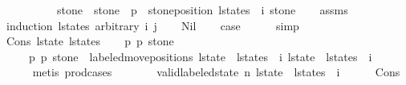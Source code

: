 \begin{isabellebody}
\ \ \ \ \ \ \ \ \ \ stone{\isacharprime}\ {\isacharequal}\ stone\ {\isasymand}\ p{}\ {\isacharequal}\ stone{\isacharunderscore}position\ {\isacharparenleft}l{\isacharunderscore}states\ {\isacharbang}\ i{\isacharparenright}\ stone{\isacharparenright}{\isacharparenright}{\isachardoublequoteclose}\isanewline
%
\isadelimproof
\ \ %
\endisadelimproof
%
\isatagproof
{}\isamarkupfalse%
\ assms\isanewline
{}\isamarkupfalse%
\ {\isacharparenleft}induction\ l{\isacharunderscore}states\ arbitrary{\isacharcolon}\ i\ j{\isacharparenright}\isanewline
\ \ \isamarkupfalse%
\ Nil\isanewline
\ \ \isamarkupfalse%
\ {\isacharquery}case\isanewline
\ \ \ \ \isamarkupfalse%
\ simp\isanewline
{}\isamarkupfalse%
\isanewline
\ \ \isamarkupfalse%
\ {\isacharparenleft}Cons\ l{\isacharunderscore}state\ l{\isacharunderscore}states{\isacharparenright}\isanewline
\ \ \isamarkupfalse%
\ p{}\ p{}\ stone{\isacharprime}\ \ \isanewline
\ \ \ \ {\isacharasterisk}{\isacharcolon}\ {\isachardoublequoteopen}{\isacharparenleft}p{}{\isacharcomma}\ p{}{\isacharcomma}\ stone{\isacharprime}{\isacharparenright}\ {\isacharequal}\ labeled{\isacharunderscore}move{\isacharunderscore}positions\ {\isacharparenleft}{\isacharparenleft}l{\isacharunderscore}state\ {\isacharhash}\ l{\isacharunderscore}states{\isacharparenright}\ {\isacharbang}\ i{\isacharparenright}\ {\isacharparenleft}{\isacharparenleft}l{\isacharunderscore}state\ {\isacharhash}\ l{\isacharunderscore}states{\isacharparenright}\ {\isacharbang}\ {\isacharparenleft}i\ {\isacharplus}\ {}{\isacharparenright}{\isacharparenright}{\isachardoublequoteclose}\isanewline
\ \ \ \ \isamarkupfalse%
\ {\isacharparenleft}metis\ prod{\isacharunderscore}cases{}{\isacharparenright}\isanewline
\isanewline
\ \ \isamarkupfalse%
\isanewline
\isanewline
\ \ \isamarkupfalse%
\ {\isacharasterisk}{\isacharasterisk}{\isacharasterisk}{\isacharcolon}\ {\isachardoublequoteopen}valid{\isacharunderscore}labeled{\isacharunderscore}state\ n\ {\isacharparenleft}{\isacharparenleft}l{\isacharunderscore}state\ {\isacharhash}\ l{\isacharunderscore}states{\isacharparenright}\ {\isacharbang}\ i{\isacharparenright}{\isachardoublequoteclose}\isanewline
\ \ \ \ \isamarkupfalse%
\ Cons{\isacharparenleft}{}{\isacharminus}{}{\isacharparenright}\isanewline
\ \ \ \ \isamarkupfalse%

\end{isabellebody}
